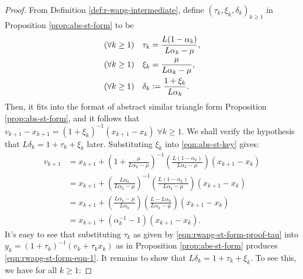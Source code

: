 \documentclass[12pt]{article}
\begin{document}
        \begin{proof}
            From Definition \ref{def:r-wapg-intermediate}, define $(\tau_k, \xi_k, \delta_k)_{k \ge 1}$ in Proposition \ref{prop:abs-st-form} to be
            \begin{align}
                (\forall k \ge 1) \quad
                \tau_k &= \frac{L(1 - \alpha_k)}{L\alpha_k - \mu},
                \label{eqn:rwapg-st-form-proof-tau}
                \\
                (\forall k \ge 1)\quad
                \xi_k &= \frac{\mu}{L \alpha_k - \mu},
                \\
                (\forall k \ge 1)\quad
                \delta_k &\vcentcolon= \frac{1 + \xi_k}{L\alpha_k}.
            \end{align}
            Then, it fits into the format of abstract similar triangle form Proposition \ref{prop:abs-st-form}, and it follows that $v_{k + 1} - x_{k + 1} = (1 + \xi_k)^{-1}(x_{k + 1} - x_k)\; \forall k \ge 1$.
            We shall verify the hypothesis that $L\delta_k = 1 + \tau_k + \xi_k$ later.
            Substituting $\xi_k$ into \eqref{eqn:abs-st-key} gives:
            \begin{align*}
                v_{k + 1} &=
                x_{k + 1} + \left(
                    1 + \frac{\mu}{L\alpha_k - \mu}
                \right)^{-1}\left(
                    \frac{L(1 - \alpha_k)}{L\alpha_k - \mu}
                \right)(x_{k + 1} - x_k)
                \\
                &=
                x_{k + 1} + \left(
                    \frac{L\alpha_k}{L\alpha_k - \mu}
                \right)^{-1}\left(
                    \frac{L(1 - \alpha_k)}{L\alpha_k - \mu}
                \right)(x_{k + 1} - x_k)
                \\
                &=
                x_{k + 1} + \left(
                    \frac{L\alpha_k - \mu}{L\alpha_k}
                \right)\left(
                    \frac{L - L\alpha_k}{L\alpha_k - \mu}
                \right)(x_{k + 1} - x_k)
                \\
                &= x_{k + 1} + (\alpha_k^{-1} - 1)(x_{k + 1} - x_k).
            \end{align*}
            It's easy to see that substituting $\tau_k$ as given by \eqref{eqn:rwapg-st-form-proof-tau} into $y_k = (1 + \tau_k)^{-1}(v_k + \tau_k x_k)$ as in Proposition \ref{prop:abs-st-form} produces \eqref{eqn:rwapg-st-form-eqn-1}.
            It remains to show that $L\delta_k = 1 + \tau_k + \xi_k$.
            To see this, we have for all $k\ge 1$:

\end{proof}
\end{document}
